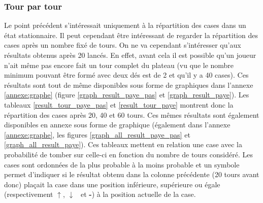 \documentclass[letterpaper]{article}
\newcommand{\caseUp}[1][]{#1\textcolor[HTML]{008000}{$\mathbf{\uparrow}$}}
\newcommand{\caseStable}[1][]{#1\textcolor[HTML]{3779dd}{\textbf{-}}}
\newcommand{\caseDown}[1][]{#1\textcolor[HTML]{dd3737}{$\mathbf{\downarrow}$}}
\begin{document}
    \subsubsection{Tour par tour}
      Le point précédent s'intéressait uniquement à la répartition des cases dans un état
      stationnaire.  Il peut cependant être intéressant de regarder la répartition des cases
      après un nombre fixé de tours.  On ne va cependant s'intéresser qu'aux résultats obtenus
      après 20 lancés.  En effet, avant cela il est possible qu'un joueur n'ait même pas encore
      fait un tour complet du plateau (vu que le nombre minimum pouvant être formé avec deux dés
      est de 2 et qu'il y a 40 cases).  Ces résultats sont tout de même disponibles sous forme de
      graphiques dans l'annexe \ref{annexe:graphe} (figure \ref{graph_result_paye_pas} et
      \ref{graph_result_paye}).  Les tableaux \ref{result_tour_paye_pas} et \ref{result_tour_paye}
      montrent donc la répartition des cases après 20, 40 et 60 tours.  Ces mêmes résultats
      sont également disponibles en annexe sous forme de graphique (également dans l'annexe
      \ref{annexe:graphe}, les figures \ref{graph_all_result_paye_pas} et \ref{graph_all_result_paye}).
      Ces tableaux mettent en relation une case avec la probabilité de tomber sur celle-ci en fonction du
      nombre de tours considéré.  Les cases sont ordonnées de la plus probable à la moins probable
      et un symbole permet d'indiquer si le résultat obtenu dans la colonne précédente (20 tours avant donc)
      plaçait la case dans une position inférieure, supérieure ou égale (respectivement \caseUp, \caseDown~
      et \caseStable) à la position actuelle de la case.
\end{document}
